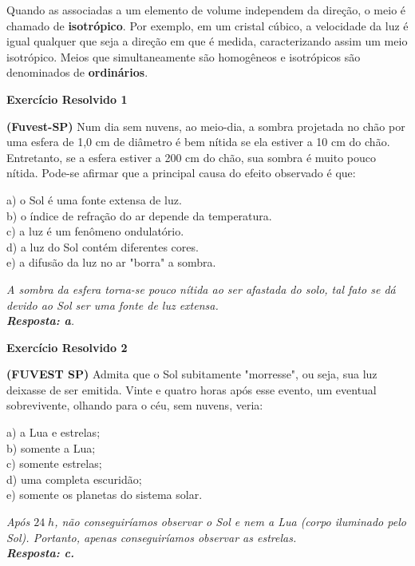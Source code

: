 \documentclass[11pt,twocolumn,oneside]{article}
\newenvironment{resposta*}
  {\bf Resposta:\\ }
  {}
\begin{document}
Quando as associadas a um elemento de volume independem da direção, o meio é chamado de \textbf{isotrópico}. Por exemplo, em um cristal cúbico, a velocidade da luz é igual qualquer que seja a direção em que é medida, caracterizando assim um meio isotrópico. Meios que simultaneamente são homogêneos e isotrópicos são denominados de \textbf{ordinários}.


\textbf{Exercício Resolvido 1}


\textbf{(Fuvest-SP)} Num dia sem nuvens, ao meio-dia, a sombra projetada no chão por uma esfera de 1,0 cm de diâmetro é bem nítida se ela estiver a 10 cm do chão. Entretanto, se a esfera estiver a 200 cm do chão, sua sombra é muito pouco nítida. Pode-se afirmar que a principal causa do efeito observado é que:


a) o Sol é uma fonte extensa de luz. \\
b) o índice de refração do ar depende da temperatura. \\
c) a luz é um fenômeno ondulatório. \\
d) a luz do Sol contém diferentes cores. \\
e) a difusão da luz no ar "borra" a sombra.


\begin{resposta*}
{\it A sombra da esfera torna-se pouco nítida ao ser afastada do solo, tal fato se dá devido ao Sol ser uma fonte de luz extensa. \\
\textbf{Resposta: a}.}
\end{resposta*}

\textbf{Exercício Resolvido 2}


\textbf{(FUVEST SP)} Admita que o Sol subitamente "morresse", ou seja, sua luz deixasse de ser emitida. Vinte e quatro horas após esse evento, um eventual sobrevivente, olhando para o céu, sem nuvens, veria:


a)	a Lua e estrelas; \\
b)	somente a Lua; \\
c)	somente estrelas; \\
d)	uma completa escuridão; \\
e)	somente os planetas do sistema solar.


\begin{resposta*}
{\it Após $24\;h$, não conseguiríamos observar o Sol e nem a Lua (corpo iluminado pelo Sol). Portanto, apenas conseguiríamos observar as estrelas. \\
\textbf{Resposta: c.}}
\end{resposta*}
\end{document}
